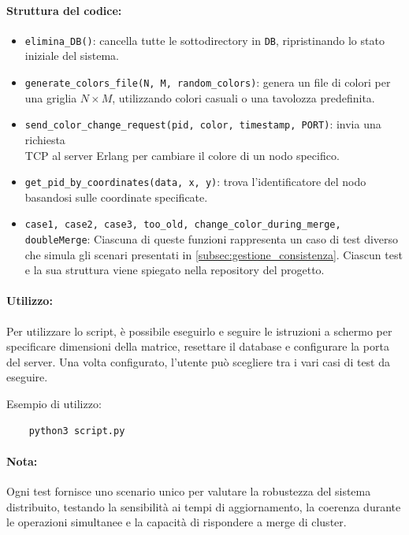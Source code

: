 \documentclass[12pt, a4paper]{report}
\begin{document}
\paragraph{Struttura del codice:}
\begin{itemize}
    \item \texttt{elimina\_DB()}: cancella tutte le sottodirectory in \texttt{DB}, ripristinando lo stato iniziale del sistema.
    \item \texttt{generate\_colors\_file(N, M, random\_colors)}: genera un file di colori per una griglia $N \times M$, utilizzando colori casuali o una tavolozza predefinita.
    \item \texttt{send\_color\_change\_request(pid, color, timestamp, PORT)}: invia una richiesta \\TCP al server Erlang per cambiare il colore di un nodo specifico.
    \item \texttt{get\_pid\_by\_coordinates(data, x, y)}: trova l’identificatore del nodo basandosi sulle coordinate specificate.
    \item \texttt{case1, case2, case3, too\_old, change\_color\_during\_merge, doubleMerge}: Ciascuna di queste funzioni rappresenta un caso di test diverso che simula gli scenari presentati in \ref{subsec:gestione_consistenza}. Ciascun test e la sua struttura viene spiegato nella repository del progetto.
\end{itemize}


\paragraph{Utilizzo:}
Per utilizzare lo script, è possibile eseguirlo e seguire le istruzioni a schermo per specificare dimensioni della matrice, resettare il database e configurare la porta del server.
Una volta configurato, l’utente può scegliere tra i vari casi di test da eseguire.

Esempio di utilizzo:
\begin{verbatim}
    python3 script.py
\end{verbatim}


\paragraph{Nota:}
Ogni test fornisce uno scenario unico per valutare la robustezza del sistema distribuito, testando la sensibilità ai tempi di aggiornamento, la coerenza durante le operazioni simultanee e la capacità di rispondere a merge di cluster.
\end{document}

